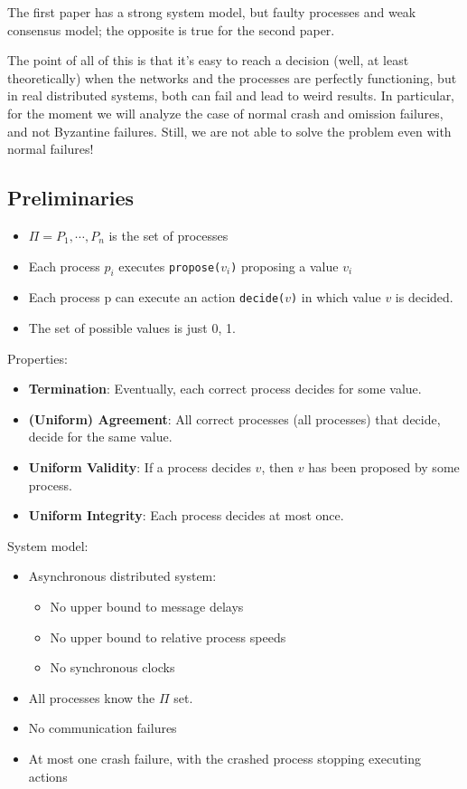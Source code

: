 \documentclass[a4paper,11pt,hidelinks]{article}
\begin{document}
The first paper has a strong system model, but faulty processes and weak consensus model; the opposite is true for the second paper.

The point of all of this is that it's easy to reach a decision (well, at least theoretically) when the networks and the processes are perfectly functioning, but in real distributed systems, both can fail and lead to weird results. In particular, for the moment we will analyze the case of normal crash and omission failures, and not Byzantine failures. Still, we are not able to solve the problem even with normal failures!

\subsection{Preliminaries}

\begin{itemize}
    \item $\Pi = {P_1, \cdots, P_n}$ is the set of processes
    \item Each process $p_i$ executes \verb=propose(=$v_i$\verb=)= proposing a value $v_i$
    \item Each process p can execute an action \verb=decide(=$v$\verb=)= in which value $v$ is decided.
    \item The set of possible values is just {0, 1}.
\end{itemize}

\noindent Properties:

\begin{itemize}
    \item \textbf{Termination}: Eventually, each correct process decides for some value.
    \item \textbf{(Uniform) Agreement}: All correct processes (all processes) that decide, decide for the same value.
    \item \textbf{Uniform Validity}: If a process decides $v$, then $v$ has been proposed by some process.
    \item \textbf{Uniform Integrity}: Each process decides at most once.
\end{itemize}

\noindent System model:

\begin{itemize}
    \item Asynchronous distributed system:
          \begin{itemize}
              \item No upper bound to message delays
              \item No upper bound to relative process speeds
              \item No synchronous clocks
          \end{itemize}
    \item All processes know the $\Pi$ set.
    \item No communication failures
    \item At most one crash failure, with the crashed process stopping executing actions
\end{itemize}
\end{document}

